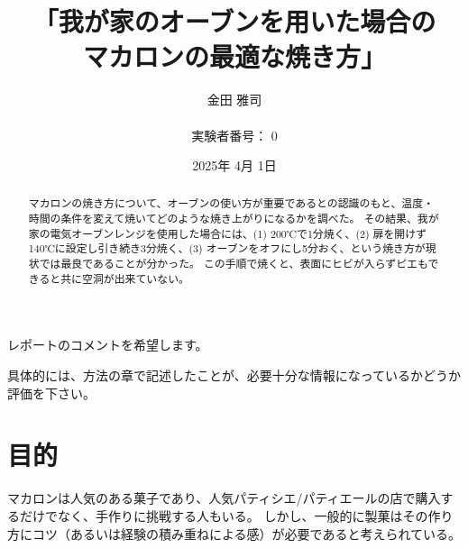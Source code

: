 \documentclass[uplatex,dvipdfmx,a4j,12pt]{jsarticle}
\title{
  「我が家のオーブンを用いた場合の\\    %
  マカロンの最適な焼き方」
  }
\author{
  金田 雅司 \\
  \\
  実験者番号： 0 \\
  }
\date{2025年 4月 1日}  %
\begin{document}
\maketitle


\vspace{2em}
\begin{center}
    \begin{minipage}{0.5\linewidth}
        レポートのコメントを希望します。

        具体的には、方法の章で記述したことが、必要十分な情報になっているかどうか評価を下さい。
    \end{minipage}
\end{center}
\vspace{5em}  


%
\begin{abstract}
    マカロンの焼き方について、オーブンの使い方が重要であるとの認識のもと、温度・時間の条件を変えて焼いてどのような焼き上がりになるかを調べた。
    その結果、我が家の電気オーブンレンジを使用した場合には、(1) 200℃で1分焼く、(2) 扉を開けず140℃に設定し引き続き3分焼く、(3) オーブンをオフにし5分おく、という焼き方が現状では最良であることが分かった。
    この手順で焼くと、表面にヒビが入らずピエもできると共に空洞が出来ていない。
\end{abstract}

\newpage



\section{目的}

マカロンは人気のある菓子であり、人気パティシエ/パティエールの店で購入するだけでなく、手作りに挑戦する人もいる。
しかし、一般的に製菓はその作り方にコツ（あるいは経験の積み重ねによる感）が必要であると考えられている。
\end{document}
